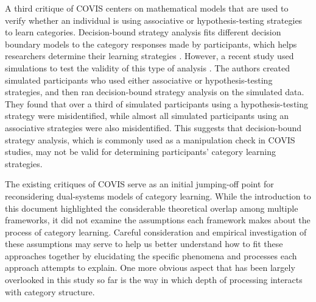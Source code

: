 \documentclass[../dissertation.tex]{subfiles}
\begin{document}
	A third critique of COVIS centers on mathematical models that are used to verify whether an individual is using associative or hypothesis-testing strategies to learn categories. Decision-bound strategy analysis fits different decision boundary models to the category responses made by participants, which helps researchers determine their learning strategies \citep{Maddox1993}. However, a recent study used simulations to test the validity of this type of analysis \citep{Edmunds2018}. The authors created simulated participants who used either associative or hypothesis-testing strategies, and then ran decision-bound strategy analysis on the simulated data. They found that over a third of simulated participants using a hypothesis-testing strategy were misidentified, while almost all simulated participants using an associative strategies were also misidentified. This suggests that decision-bound strategy analysis, which is commonly used as a manipulation check in COVIS studies, may not be valid for determining participants' category learning strategies. \par
	The existing critiques of COVIS serve as an initial jumping-off point for reconsidering dual-systems models of category learning. While the introduction to this document highlighted the considerable theoretical overlap among multiple frameworks, it did not examine the assumptions each framework makes about the process of category learning. Careful consideration and empirical investigation of these assumptions may serve to help us better understand how to fit these approaches together by elucidating the specific phenomena and processes each approach attempts to explain. One more obvious aspect that has been largely overlooked in this study so far is the way in which depth of processing interacts with category structure.
	
\end{document}
